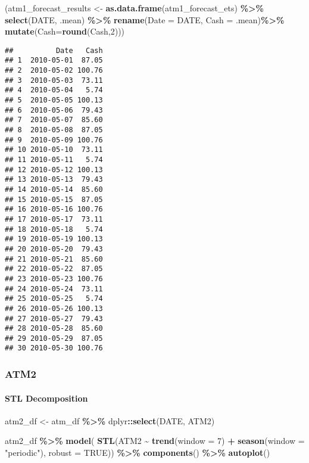 \documentclass[
]{article}
\newenvironment{Shaded}{\begin{snugshade}}{\end{snugshade}}
\newcommand{\AttributeTok}[1]{\textcolor[rgb]{0.13,0.29,0.53}{#1}}
\newcommand{\ConstantTok}[1]{\textcolor[rgb]{0.56,0.35,0.01}{#1}}
\newcommand{\DecValTok}[1]{\textcolor[rgb]{0.00,0.00,0.81}{#1}}
\newcommand{\FunctionTok}[1]{\textcolor[rgb]{0.13,0.29,0.53}{\textbf{#1}}}
\newcommand{\NormalTok}[1]{#1}
\newcommand{\OtherTok}[1]{\textcolor[rgb]{0.56,0.35,0.01}{#1}}
\newcommand{\SpecialCharTok}[1]{\textcolor[rgb]{0.81,0.36,0.00}{\textbf{#1}}}
\newcommand{\StringTok}[1]{\textcolor[rgb]{0.31,0.60,0.02}{#1}}
\begin{document}
\begin{Shaded}
\begin{Highlighting}[]
\NormalTok{(atm1\_forecast\_results }\OtherTok{\textless{}{-}} 
  \FunctionTok{as.data.frame}\NormalTok{(atm1\_forecast\_ets) }\SpecialCharTok{\%\textgreater{}\%}
    \FunctionTok{select}\NormalTok{(DATE, .mean) }\SpecialCharTok{\%\textgreater{}\%} 
      \FunctionTok{rename}\NormalTok{(}\AttributeTok{Date =}\NormalTok{ DATE, }\AttributeTok{Cash =}\NormalTok{ .mean)}\SpecialCharTok{\%\textgreater{}\%}
        \FunctionTok{mutate}\NormalTok{(}\AttributeTok{Cash=}\FunctionTok{round}\NormalTok{(Cash,}\DecValTok{2}\NormalTok{)))}
\end{Highlighting}
\end{Shaded}

\begin{verbatim}
##          Date   Cash
## 1  2010-05-01  87.05
## 2  2010-05-02 100.76
## 3  2010-05-03  73.11
## 4  2010-05-04   5.74
## 5  2010-05-05 100.13
## 6  2010-05-06  79.43
## 7  2010-05-07  85.60
## 8  2010-05-08  87.05
## 9  2010-05-09 100.76
## 10 2010-05-10  73.11
## 11 2010-05-11   5.74
## 12 2010-05-12 100.13
## 13 2010-05-13  79.43
## 14 2010-05-14  85.60
## 15 2010-05-15  87.05
## 16 2010-05-16 100.76
## 17 2010-05-17  73.11
## 18 2010-05-18   5.74
## 19 2010-05-19 100.13
## 20 2010-05-20  79.43
## 21 2010-05-21  85.60
## 22 2010-05-22  87.05
## 23 2010-05-23 100.76
## 24 2010-05-24  73.11
## 25 2010-05-25   5.74
## 26 2010-05-26 100.13
## 27 2010-05-27  79.43
## 28 2010-05-28  85.60
## 29 2010-05-29  87.05
## 30 2010-05-30 100.76
\end{verbatim}

\hypertarget{atm2}{%
\subsubsection{ATM2}\label{atm2}}

\hypertarget{stl-decomposition-1}{%
\paragraph{STL Decomposition}\label{stl-decomposition-1}}

\begin{Shaded}
\begin{Highlighting}[]
\NormalTok{atm2\_df }\OtherTok{\textless{}{-}}\NormalTok{ atm\_df }\SpecialCharTok{\%\textgreater{}\%} 
\NormalTok{  dplyr}\SpecialCharTok{::}\FunctionTok{select}\NormalTok{(DATE, ATM2)}

\NormalTok{atm2\_df }\SpecialCharTok{\%\textgreater{}\%}
  \FunctionTok{model}\NormalTok{(}
    \FunctionTok{STL}\NormalTok{(ATM2 }\SpecialCharTok{\textasciitilde{}} \FunctionTok{trend}\NormalTok{(}\AttributeTok{window =} \DecValTok{7}\NormalTok{) }\SpecialCharTok{+}
                   \FunctionTok{season}\NormalTok{(}\AttributeTok{window =} \StringTok{"periodic"}\NormalTok{),}
    \AttributeTok{robust =} \ConstantTok{TRUE}\NormalTok{)) }\SpecialCharTok{\%\textgreater{}\%}
  \FunctionTok{components}\NormalTok{() }\SpecialCharTok{\%\textgreater{}\%}
  \FunctionTok{autoplot}\NormalTok{()}
\end{Highlighting}
\end{Shaded}
\end{document}
